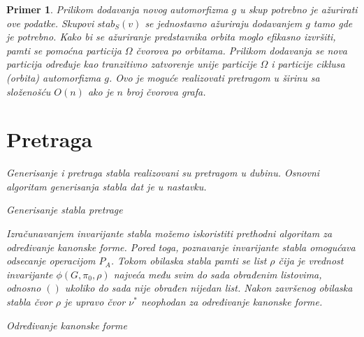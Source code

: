 \documentclass[12pt,oneside]{memoir}
\newtheorem{example}{Primer}
\theoremstyle{definition}
\begin{document}
\begin{example}
  Prilikom dodavanja novog automorfizma $g$ u skup potrebno je ažurirati ove
  podatke. Skupovi $stab_S(v)$ se jednostavno ažuriraju dodavanjem $g$ tamo gde
  je potrebno. Kako bi se ažuriranje predstavnika orbita moglo efikasno
  izvršiti, pamti se pomoćna particija $\Omega$ čvorova po orbitama. Prilikom
  dodavanja se nova particija određuje kao tranzitivno zatvorenje unije
  particije $\Omega$ i particije ciklusa (orbita) automorfizma $g$. Ovo je moguće
  realizovati pretragom u širinu sa složenošću $O(n)$ ako je $n$ broj
  čvorova grafa.

 \section{Pretraga}

  Generisanje i pretraga stabla realizovani su pretragom u dubinu. Osnovni
  algoritam generisanja stabla dat je u nastavku.

  \begin{algorithm}[H]
	  \caption{Generisanje stabla pretrage}
	  \begin{algorithmic}[1]
		  \EndFor
		  \EndProcedure
	  \end{algorithmic}
  \end{algorithm}

  Izračunavanjem invarijante stabla možemo iskoristiti prethodni algoritam za
  određivanje kanonske forme. Pored toga, poznavanje invarijante stabla
  omogućava odsecanje operacijom $P_A$. Tokom obilaska stabla pamti se list
  $\rho$ čija je vrednost invarijante $\phi(G, \pi_0, \rho)$ najveća među svim
  do sada obrađenim listovima, odnosno $()$ ukoliko do sada nije obrađen
  nijedan list. Nakon završenog obilaska stabla čvor $\rho$ je upravo čvor
  $\nu^*$ neophodan za određivanje kanonske forme.

  \begin{algorithm}[H]
	  \caption{Određivanje kanonske forme}
	  \begin{algorithmic}[1]
		  	\State \Return
		  \EndIf
		  \EndFor
				\State {$\rho \gets \nu$}
			\EndIf
		  \EndIf
		  \EndProcedure
	  \end{algorithmic}
  \end{algorithm}


\end{example}
\end{document}
